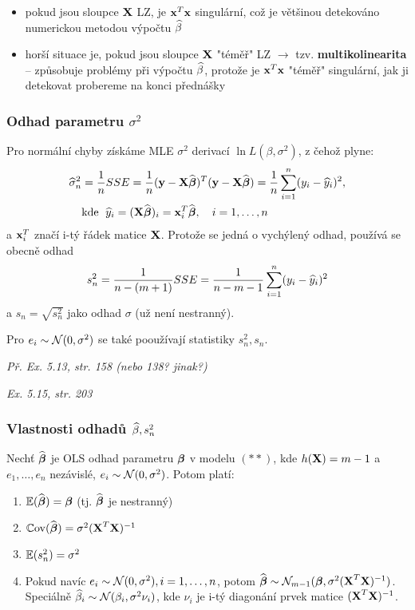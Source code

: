 \begin{remark}
	\begin{itemize}
		\item pokud jsou sloupce $\textbf{X}$ LZ, je $\textbf{x}^T\textbf{x}$ singulární, což je většinou detekováno numerickou metodou výpočtu $\widehat{\beta}$
		\item horší situace je, pokud jsou sloupce $\textbf{X}$ "téměř" LZ $\rightarrow$ tzv. \textbf{multikolinearita} -- způsobuje problémy při výpočtu $\widehat{\beta}$, protože je $\textbf{x}^T\textbf{x}$ "téměř" singulární, jak ji detekovat probereme na konci přednášky
	\end{itemize}
\end{remark}

\subsubsection{Odhad parametru $\sigma^2$}
Pro normální chyby získáme MLE $\sigma^2$ derivací $\ln L(\beta, \sigma^2)$, z čehož plyne:
\begin{align*}
	\widehat{\sigma}_n^2 & = \frac{1}{n} SSE = \frac{1}{n}(\textbf{y} - \textbf{X} \widehat{\boldsymbol{\beta}})^T(\textbf{y} - \textbf{X} \widehat{\boldsymbol{\beta}}) = \frac{1}{n} \sum\limits_{i=1}^{n}(y_i - \widehat{y}_i)^2, \\
	& \text{kde \;} \widehat{y}_i = (\textbf{X} \widehat{\boldsymbol{\beta}})_i = \textbf{x}_i^T \widehat{\boldsymbol{\beta}}, \quad i = 1, \dots, n \\
\end{align*}
a $\textbf{x}_i^T$ značí i-tý řádek matice $\textbf{X}$. Protože se jedná o vychýlený odhad, používá se obecně odhad
$$
	s_n^2 = \frac{1}{n-(m+1)} SSE = \frac{1}{n - m - 1} \sum\limits_{i=1}^{n}(y_i - \widehat{y}_i)^2
$$
a $s_n = \sqrt{s_n^2}$ jako odhad $\sigma$ (už není nestranný).

Pro $e_i \sim \mathcal{N}(0,\sigma^2)$ se také pooužívají statistiky $s_n^2, s_n$.

\textit{Př. Ex. 5.13, str. 158 (nebo 138? jinak?)}

\textit{Ex. 5.15, str. 203}

\subsubsection{Vlastnosti odhadů $\widehat{\beta}, s_n^2$}
\begin{theorem}
	Nechť $\widehat{\boldsymbol{\beta}}$ je OLS odhad parametru $\boldsymbol{\beta}$ v modelu $(**)$, kde $h(\textbf{X}) = m-1$ a $e_1, \dots, e_n$ nezávislé, $e_i \sim \mathcal{N}(0,\sigma^2)$. Potom platí:
	\begin{enumerate}
		\item $\mathbb{E}(\widehat{\boldsymbol{\beta}}) = \boldsymbol{\beta}$ (tj. $\widehat{\boldsymbol{\beta}}$ je nestranný)
		\item $\mathbb{C}\mathrm{ov}(\widehat{\boldsymbol{\beta}}) = \sigma^2 (\textbf{X}^T \textbf{X})^{-1}$
		\item $\mathbb{E}(s_n^2) = \sigma^2$
		\item Pokud navíc $e_i \sim \mathcal{N}(0,\sigma^2), i = 1, \dots, n$, potom $\widehat{\boldsymbol{\beta}} \sim \mathcal{N}_{m-1}(\boldsymbol{\beta}, \sigma^2(\textbf{X}^T \textbf{X})^{-1})$. Speciálně $\widehat{\beta}_i \sim \mathcal{N}(\beta_i, \sigma^2 \nu_i)$, kde $\nu_i$ je i-tý diagonání prvek matice $(\textbf{X}^T \textbf{X})^{-1}$.
	\end{enumerate}
\end{theorem}


